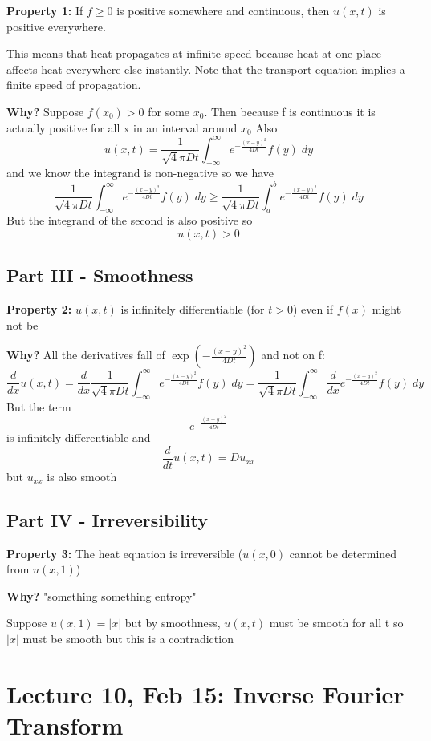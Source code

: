 \documentclass[12pt]{article}
\begin{document}
\textbf{Property 1:} If $f \geq 0$ is positive somewhere and continuous, then $u(x, t)$ is positive everywhere. 

This means that heat propagates at infinite speed because heat at one place affects heat everywhere else instantly. Note that the transport equation implies a finite speed of propagation.

\textbf{Why?} 
Suppose $f(x_0) > 0$ for some $x_0$. Then because f is continuous it is actually positive for all x in an interval around $x_0$
Also 
\[u(x, t) = \frac{1}{\sqrt4\pi D t} \int_{-\infty}^\infty e^{-\frac{(x - y)^2}{4Dt}} f(y) \; dy\]
and we know the integrand is non-negative so we have 
\[\frac{1}{\sqrt4\pi D t} \int_{-\infty}^\infty e^{-\frac{(x - y)^2}{4Dt}} f(y) \; dy \geq \frac{1}{\sqrt4\pi D t} \int_{a}^b e^{-\frac{(x - y)^2}{4Dt}} f(y) \; dy\]
But the integrand of the second is also positive so 
\[u(x, t) > 0\] 

\subsection*{Part III  - Smoothness}
\textbf{Property 2:} $u(x, t)$ is infinitely differentiable (for $t >0$) even if $f(x)$ might not be 

\textbf{Why?}
All the derivatives fall of $\exp(-\frac{(x-y)^2}{4Dt})$ and not on f:
\[\frac{d}{dx} u(x, t) = \frac{d}{dx} \frac{1}{\sqrt4\pi D t} \int_{-\infty}^\infty e^{-\frac{(x - y)^2}{4Dt}} f(y) \; dy = \frac{1}{\sqrt4\pi D t} \int_{-\infty}^\infty \frac{d}{dx} e^{-\frac{(x - y)^2}{4Dt}} f(y) \; dy\]
But the term 
\[e^{-\frac{(x - y)^2}{4Dt}}\]
is infinitely differentiable and 
\[\frac{d}{dt}u(x, t) = Du_{xx}\]
but $u_{xx}$ is also smooth 

\subsection*{Part IV - Irreversibility}
\textbf{Property 3:} The heat equation is irreversible ($u(x, 0)$ cannot be determined from $u(x, 1)$)

\textbf{Why?}
"something something entropy"

Suppose $u(x, 1) = |x|$ but by smoothness, $u(x, t)$ must be smooth for all t so $|x|$ must be smooth but this is a contradiction

\section*{Lecture 10, Feb 15: Inverse Fourier Transform}
\end{document}
